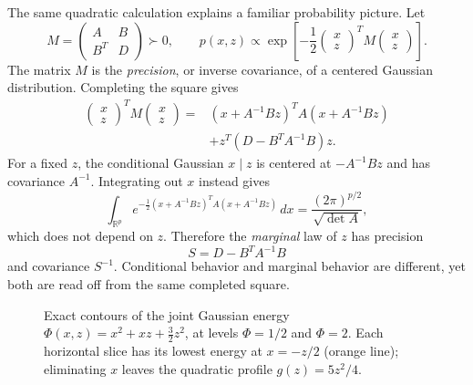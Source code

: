 The same quadratic calculation explains a familiar probability picture. Let
\[
 M=\begin{pmatrix}A&B\\B^T&D\end{pmatrix}\succ0,
 \qquad
 p(x,z)\propto
 \exp\left[-\frac12
 \begin{pmatrix}x\\z\end{pmatrix}^{\!T}
 M\begin{pmatrix}x\\z\end{pmatrix}\right].
\]
The matrix $M$ is the \emph{precision}, or inverse covariance, of a centered Gaussian distribution. Completing the square gives
\[
\begin{aligned}
 \begin{pmatrix}x\\z\end{pmatrix}^{\!T}M
 \begin{pmatrix}x\\z\end{pmatrix}
  ={}&(x+A^{-1}Bz)^TA(x+A^{-1}Bz)\\
     &+z^T(D-B^TA^{-1}B)z.
\end{aligned}
\]
For a fixed $z$, the conditional Gaussian $x\mid z$ is centered at
$-A^{-1}Bz$ and has covariance $A^{-1}$. Integrating out $x$ instead gives
\[
 \int_{\mathbb R^p}
 e^{-\frac12(x+A^{-1}Bz)^TA(x+A^{-1}Bz)}\,dx
 =\frac{(2\pi)^{p/2}}{\sqrt{\det A}},
\]
which does not depend on $z$. Therefore the \emph{marginal} law of $z$ has precision
\[
 \boxed{S=D-B^TA^{-1}B}
\]
and covariance $S^{-1}$. Conditional behavior and marginal behavior are different, yet both are read off from the same completed square.

\begin{figure}[H]
\centering
{}
\caption{Exact contours of the joint Gaussian energy $\Phi(x,z)=x^2+xz+\tfrac32z^2$, at levels $\Phi=1/2$ and $\Phi=2$. Each horizontal slice has its lowest energy at $x=-z/2$ (orange line); eliminating $x$ leaves the quadratic profile $g(z)=5z^2/4$.}
\end{figure}

